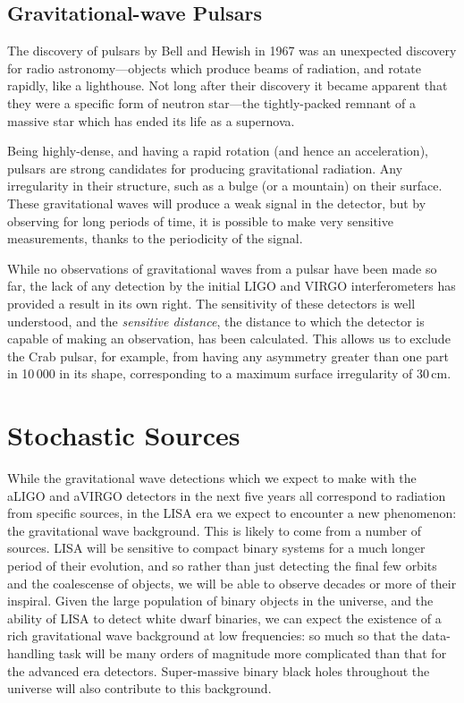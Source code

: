 \documentclass{kentigern}
\begin{document}
\subsection{Gravitational-wave Pulsars}
\label{sec:pulsar}

The discovery of pulsars by Bell and Hewish in 1967 was an unexpected
discovery for radio astronomy---objects which produce beams of
radiation, and rotate rapidly, like a lighthouse. Not long after their
discovery it became apparent that they were a specific form of neutron
star---the tightly-packed remnant of a massive star which has ended
its life as a supernova.

Being highly-dense, and having a rapid rotation (and hence an
acceleration), pulsars are strong candidates for producing
gravitational radiation. Any irregularity in their structure, such as
a bulge (or a mountain) on their surface. These gravitational waves
will produce a weak signal in the detector, but by observing for long
periods of time, it is possible to make very sensitive measurements,
thanks to the periodicity of the signal.

While no observations of gravitational waves from a pulsar have been
made so far, the lack of any detection by the initial LIGO and VIRGO
interferometers has provided a result in its own right. The
sensitivity of these detectors is well understood, and the
\emph{sensitive distance}, the distance to which the detector is
capable of making an observation, has been calculated. This allows us
to exclude the Crab pulsar, for example, from having any asymmetry
greater than one part in 10\,000 in its shape\cite{2009LRR....12....2S}, corresponding to a maximum surface
irregularity of 30\,cm\cite{2014ApJ...785..119A}.

\section{Stochastic Sources}
\label{sec:stochastic-sources}

While the gravitational wave detections which we expect to make with
the aLIGO and aVIRGO detectors in the next five years all correspond
to radiation from specific sources, in the LISA era we expect to
encounter a new phenomenon: the gravitational wave
background\cite{2009LRR....12....2S}. This is likely to come from a
number of sources. LISA will be sensitive to compact binary systems
for a much longer period of their evolution, and so rather than just
detecting the final few orbits and the coalescense of objects, we will
be able to observe decades or more of their inspiral. Given the large
population of binary objects in the universe, and the ability of LISA
to detect white dwarf binaries, we can expect the existence of a rich
gravitational wave background at low frequencies: so much so that the
data-handling task will be many orders of magnitude more complicated
than that for the advanced era detectors.  Super-massive binary black
holes throughout the universe will also contribute to this background.
\end{document}
